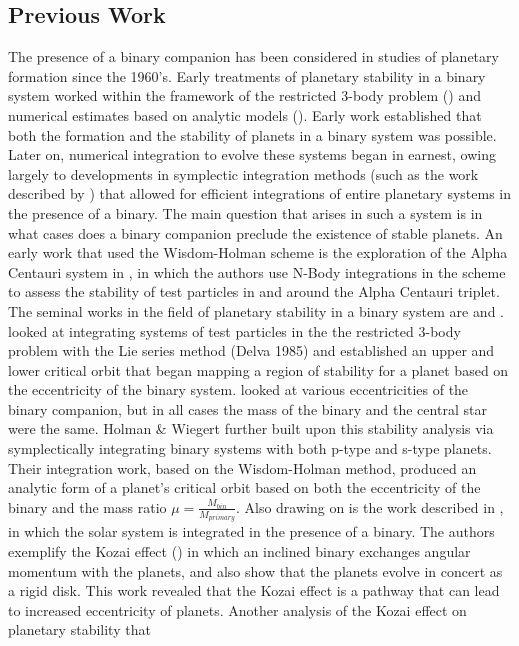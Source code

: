 \documentclass{aastex631}
\begin{document}
\subsection{Previous Work}
The presence of a binary companion has been considered in studies of planetary formation since the 1960's. Early treatments of planetary stability in a binary system worked
within the framework of the restricted 3-body problem (\cite{hua60}) and numerical estimates based on analytic models (\cite{hep78}). Early work established that 
both the formation and the stability of planets in a binary system was possible.\\
Later on, numerical integration to evolve these systems began in earnest, owing largely to developments in symplectic integration methods (such as the work described 
by \cite{wis91}) that 
allowed for efficient integrations of entire planetary systems in the presence of a binary. The main question that arises in such a system is in what cases does a binary 
companion preclude the existence of stable planets. An early work that used the Wisdom-Holman scheme is the exploration of the Alpha Centauri system in \cite{wie97},
in which the authors use N-Body integrations in the \cite{wis91} scheme to assess the stability of test particles in and around the Alpha Centauri triplet. \\
The seminal works in the field of planetary stability in a binary system are \cite{dvo86} and \cite{hol99}. \cite{dvo86} looked at integrating systems of test
particles in the
the restricted 3-body problem with the Lie series method (Delva 1985) and established an upper and lower critical orbit that began mapping a region of stability 
for a planet based on the eccentricity of the binary system. \cite{dvo86} looked at various eccentricities of the binary companion, but in all cases the mass of the binary and 
the central star were the same. 
 Holman \& Wiegert further built upon this stability analysis via symplectically integrating binary systems 
with both p-type and s-type planets. Their integration work, based on the Wisdom-Holman method,
 produced an analytic form of a planet's critical orbit based on both the eccentricity of the binary and the mass
ratio $\mu = \frac{M_{bin}}{M_{primary}}$. Also drawing on \cite{wis91} is the work described in \cite{ina97}, in which the solar system is integrated in the presence of a 
binary. The authors exemplify the Kozai effect (\cite{koz62}) in which an inclined binary exchanges angular momentum with the planets, and also show that the planets evolve in concert 
as a rigid disk. This work revealed that the Kozai effect is a pathway that can lead to increased eccentricity of planets. Another analysis of the Kozai effect on planetary stability that 
\end{document}
